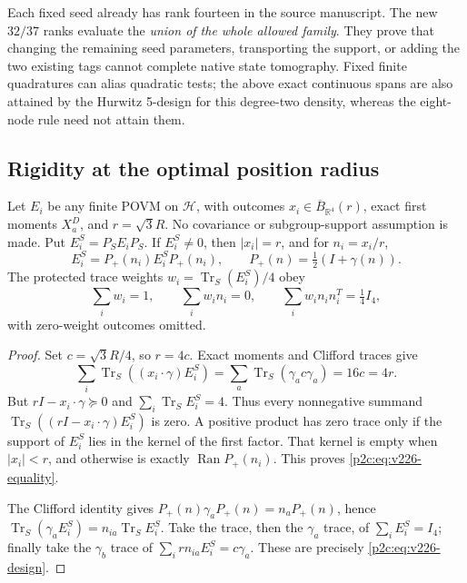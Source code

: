 \documentclass[12pt,a4paper]{article}
\begin{document}
\begin{remark}
Each fixed seed already has rank fourteen in the source manuscript. The
new $32/37$ ranks evaluate the \emph{union of the whole allowed family}.
They prove that changing the remaining seed parameters, transporting the
support, or adding the two existing tags cannot complete native state
tomography. Fixed finite quadratures can alias quadratic tests; the above
exact continuous spans are also attained by the Hurwitz 5-design for this
degree-two density, whereas the eight-node rule need not attain them.
\end{remark}
\subsection{Rigidity at the optimal position radius}
\label{p2c:sec:v226-outcomes}

\begin{theorem}
\label{p2c:thm:v226-equality}
Let $E_i$ be any finite POVM on $\mathcal H$, with outcomes
$x_i\in\overline B_{\mathbb{R}^4}(r)$, exact first moments $X_a^D$, and
$r=\sqrt3R$. No covariance or subgroup-support assumption is made.
Put $E_i^S=P_SE_iP_S$. If $E_i^S\ne0$, then
$|x_i|=r$, and for $n_i=x_i/r$,
\begin{equation}\label{p2c:eq:v226-equality}
 E_i^S=P_+(n_i)E_i^SP_+(n_i),\qquad
 P_+(n)=\tfrac12(I+\gamma(n)).
\end{equation}
The protected trace weights $w_i=\operatorname{Tr}_S(E_i^S)/4$ obey
\begin{equation}\label{p2c:eq:v226-design}
 \sum_iw_i=1,\qquad \sum_iw_in_i=0,\qquad
 \sum_iw_in_in_i^T=\tfrac14 I_4,
\end{equation}
with zero-weight outcomes omitted.
\end{theorem}
\begin{proof}
Set $c=\sqrt3R/4$, so $r=4c$. Exact moments and Clifford traces give
\[
 \sum_i\operatorname{Tr}_S((x_i\cdot\gamma)E_i^S)
 =\sum_a\operatorname{Tr}_S(\gamma_a c\gamma_a)=16c=4r.
\]
But $rI-x_i\cdot\gamma\succeq0$ and $\sum_i\operatorname{Tr}_S E_i^S=4$.
Thus every nonnegative summand
$\operatorname{Tr}_S((rI-x_i\cdot\gamma)E_i^S)$ is zero. A positive product has
zero trace only if the support of $E_i^S$ lies in the kernel of the first
factor. That kernel is empty when $|x_i|<r$, and otherwise is exactly
$\operatorname{Ran}P_+(n_i)$. This proves \eqref{p2c:eq:v226-equality}.

The Clifford identity gives
$P_+(n)\gamma_aP_+(n)=n_aP_+(n)$, hence
$\operatorname{Tr}_S(\gamma_aE_i^S)=n_{ia}\operatorname{Tr}_SE_i^S$.
Take the trace, then the $\gamma_a$ trace, of $\sum_iE_i^S=I_4$;
finally take the $\gamma_b$ trace of
$\sum_irn_{ia}E_i^S=c\gamma_a$. These are precisely
\eqref{p2c:eq:v226-design}.
\end{proof}
\end{document}
